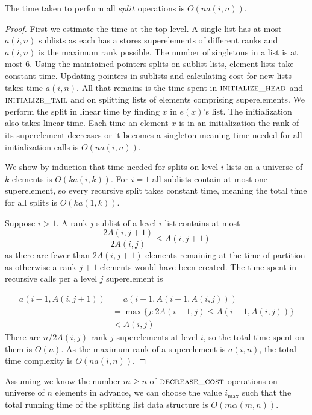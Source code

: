 \begin{theorem}
    The time taken to perform all $split$ operations is $O(na(i,n))$.
\end{theorem}

\begin{proof}
    First we estimate the time at the top level. A single list has at most $a(i,n)$ sublists as each has a stores superelements of different ranks and $a(i,n)$ is the maximum rank possible. The number of singletons in a list is at most $6$. Using the maintained pointers splits on sublist lists, element lists take constant time. Updating pointers in sublists and calculating cost for new lists takes time $a(i,n)$. All that remains is the time spent in $\textsc{initialize\_head}$ and $\textsc{initialize\_tail}$ and on splitting lists of elements comprising superelements. We perform the split in linear time by finding $x$ in $e(x)$'s list. The initialization also takes linear time. Each time an element $x$ is in an initialization the rank of its superelement decreases or it becomes a singleton meaning time needed for all initialization calls is $O(na(i,n))$.

    We show by induction that time needed for splits on level $i$ lists on a universe of $k$ elements is $O(ka(i,k))$. For $i=1$ all sublists contain at most one superelement, so every recursive split takes constant time, meaning the total time for all splits is $O(ka(1,k))$.

    Suppose $i > 1$. A rank $j$ sublist of a level $i$ list contains at most 
    \[\frac{2A(i,j+1)}{2A(i,j)} \leq A(i,j+1)\]
    as there are fewer than $2A(i,j+1)$ elements remaining at the time of partition as otherwise a rank $j+1$ elements would have been created. The time spent in recursive calls per a level $j$ superelement is

    \begin{align*}
        a(i-1,A(i,j+1)) &= a(i-1, A(i-1,A(i,j))) \\
        &= \max \{ j: 2A(i-1,j) \leq A(i-1,A(i,j)) \} \\
        &< A(i,j) 
    \end{align*}
    There are $n / 2A(i,j)$ rank $j$ superelements at level $i$, so the total time spent on them is $O(n)$. As the maximum rank of a superelement is $a(i,n)$, the total time complexity is $O(na(i,n))$.

\end{proof}

\begin{theorem}\label{thm:sfm_time}
    Assuming we know the number $m \geq n$ of $\textsc{decrease\_cost}$ operations on universe of $n$ elements in advance, we can choose the value $i_{\max}$ such that the total running time of the splitting list data structure is $O(m\alpha(m,n))$.
\end{theorem}

